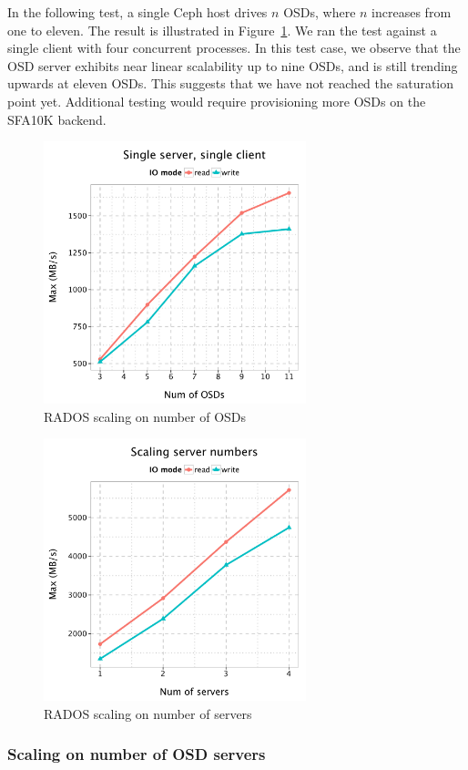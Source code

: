 In the following test, a single Ceph host drives $n$ OSDs, where $n$ increases
from one to eleven. The result is illustrated in Figure~\ref{fig:osd-scale}.
We ran the test against a single client with four concurrent processes. In this
test case, we observe that the OSD server exhibits near linear scalability up to
nine OSDs, and is still trending upwards at eleven OSDs. This suggests that we
have not reached the saturation point yet. Additional testing would require
provisioning more OSDs on the SFA10K backend.


\begin{figure}[!t]
\centering
\includegraphics[width=3in]{data/rados_osd}
\caption{RADOS scaling on number of OSDs}
\label{fig:osd-scale}
\end{figure}

\begin{figure}[!t]
\centering
\includegraphics[width=3in]{data/rados_server}
\caption{RADOS scaling on number of servers}
\label{fig:oss-scale}
\end{figure}

\subsubsection{Scaling on number of OSD servers}

